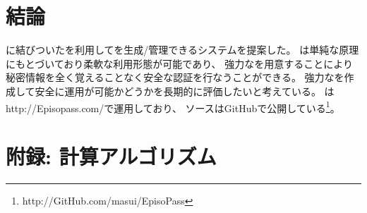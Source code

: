 \documentclass[twoside]{wiss}
\begin{document}
%
%

%
%

\section{結論}

{\EM}に結びついた{\SQ}を利用して{\PW}を生成/管理できるシステム{\EP}を提案した。
{\EP}は単純な原理にもとづいており柔軟な利用形態が可能であり、
強力な{\SQ}を用意することにより
秘密情報を全く覚えることなく安全な認証を行なうことができる。
%
強力な{\SQ}を作成して安全に運用が可能かどうかを長期的に評価したいと考えている。
%
%
{\EP}は\textsf{http://Episopass.com/}で運用しており、
ソースはGitHubで公開している\footnote{
  \textsf{http://GitHub.com/masui/EpisoPass}
}。




\section*{附録: {\PW}計算アルゴリズム}
\end{document}

